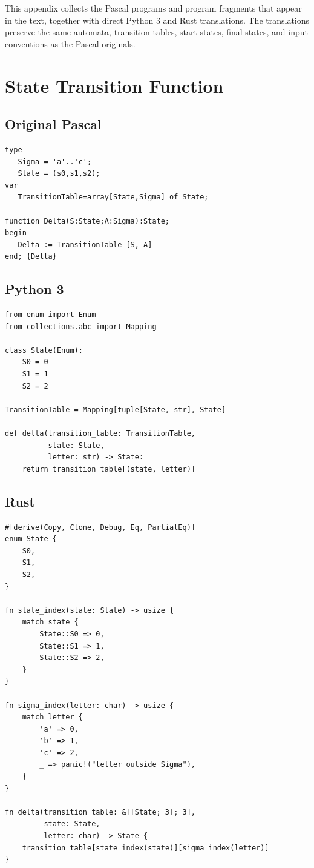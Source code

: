 This appendix collects the Pascal programs and program fragments that appear in
the text, together with direct Python 3 and Rust translations.  The translations
preserve the same automata, transition tables, start states, final states, and
input conventions as the Pascal originals.

\section{State Transition Function}

\subsection*{Original Pascal}
\begin{verbatim}
type
   Sigma = 'a'..'c';
   State = (s0,s1,s2);
var
   TransitionTable=array[State,Sigma] of State;

function Delta(S:State;A:Sigma):State;
begin
   Delta := TransitionTable [S, A]
end; {Delta}
\end{verbatim}

\subsection*{Python 3}
\begin{verbatim}
from enum import Enum
from collections.abc import Mapping

class State(Enum):
    S0 = 0
    S1 = 1
    S2 = 2

TransitionTable = Mapping[tuple[State, str], State]

def delta(transition_table: TransitionTable,
          state: State,
          letter: str) -> State:
    return transition_table[(state, letter)]
\end{verbatim}

\subsection*{Rust}
\begin{verbatim}
#[derive(Copy, Clone, Debug, Eq, PartialEq)]
enum State {
    S0,
    S1,
    S2,
}

fn state_index(state: State) -> usize {
    match state {
        State::S0 => 0,
        State::S1 => 1,
        State::S2 => 2,
    }
}

fn sigma_index(letter: char) -> usize {
    match letter {
        'a' => 0,
        'b' => 1,
        'c' => 2,
        _ => panic!("letter outside Sigma"),
    }
}

fn delta(transition_table: &[[State; 3]; 3],
         state: State,
         letter: char) -> State {
    transition_table[state_index(state)][sigma_index(letter)]
}
\end{verbatim}

